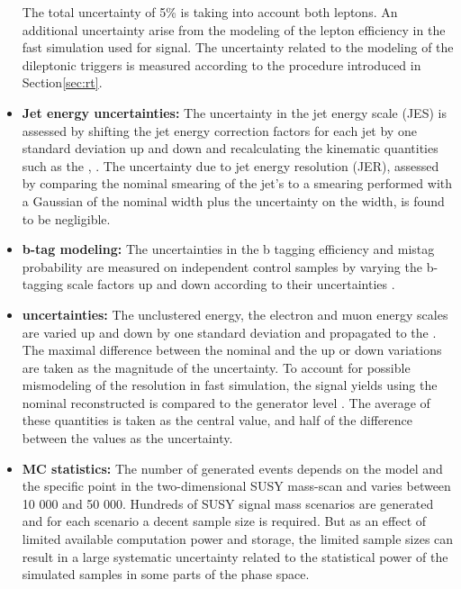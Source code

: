 \begin{itemize}
The total uncertainty of 5\% is taking into account both leptons. An additional uncertainty arise from the modeling of the lepton efficiency in the fast simulation used for signal. 
The uncertainty related to the modeling of the dileptonic triggers is measured according to the procedure introduced in Section\ref{sec:rt}. 
\item{\bf{Jet energy uncertainties:}}
The uncertainty in the jet energy scale (JES) is assessed by shifting the jet energy correction factors for each jet by one standard deviation up and down and recalculating the kinematic quantities such as the \ptmiss, \mttwo. 
The uncertainty due to jet energy resolution (JER), assessed by comparing the nominal smearing of the jet's \pt to a smearing performed with a Gaussian of the nominal width plus the uncertainty on the width, is found to be negligible.  
\item{\bf{b-tag modeling:}} The uncertainties in the b tagging efficiency and mistag probability are measured on independent control samples by varying the b-tagging scale factors up and down according to their uncertainties \cite{Sirunyan:2017ezt}. 
\item{\bf{\ptmiss uncertainties:}} The unclustered energy, the electron and muon energy scales are varied up and down by one standard deviation and propagated to the \ptmiss. 
The maximal difference between the nominal \ptmiss and the up or down variations are taken as the magnitude of the uncertainty. 
To account for possible mismodeling of the \ptmiss resolution in fast simulation, the signal yields using the nominal reconstructed \ptmiss is compared to the generator level \ptmiss. 
The average of these \ptmiss quantities is taken as the central value, and half of the difference between the values as the uncertainty. 
\item{\bf{MC statistics:}} 
The number of generated events depends on the model and the specific point in the two-dimensional SUSY mass-scan and varies between 10 000 and 50 000.
Hundreds of SUSY signal mass scenarios are generated and for each scenario a decent sample size is required. 
But as an effect of limited available computation power and storage, the limited sample sizes can result in a large systematic uncertainty related to the statistical power of the simulated samples in some parts of the phase space. 
\end{itemize}
